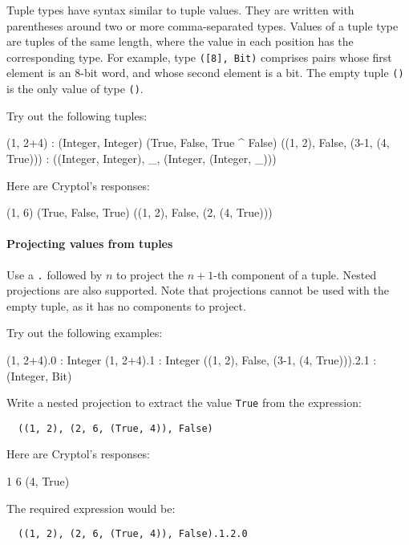 Tuple types have syntax similar to tuple values. They are written with
parentheses around two or more comma-separated types. Values of a
tuple type are tuples of the same length, where the value in each
position has the corresponding type. For example, type \texttt{([8],
  Bit)} comprises pairs whose first element is an 8-bit word, and whose
second element is a bit. The empty tuple \texttt{()} is the only value
of type \texttt{()}.

\begin{Exercise}\label{ex:tup:1}
Try out the following tuples:
\restartrepl
\begin{replinVerb}
  (1, 2+4) : (Integer, Integer)
  (True, False, True ^ False)
  ((1, 2), False, (3-1, (4, True))) : ((Integer, Integer), _, (Integer, (Integer, _)))
\end{replinVerb}
\end{Exercise}
\begin{Answer}
Here are Cryptol's responses:
\begin{reploutVerb}
  (1, 6)
  (True, False, True)
  ((1, 2), False, (2, (4, True)))
\end{reploutVerb}
\end{Answer}


\paragraph*{Projecting values from tuples} Use a \texttt{.} followed by
$n$ to project the $n+1$-th component of a tuple. Nested projections
are also supported. Note that projections cannot be used with the
empty tuple, as it has no components to project.

\begin{Exercise}\label{ex:tup:2}
Try out the following examples:
\restartrepl
\begin{replinVerb}
  (1, 2+4).0 : Integer
  (1, 2+4).1 : Integer
  ((1, 2), False, (3-1, (4, True))).2.1 : (Integer, Bit)
\end{replinVerb}
Write a nested projection to extract the value \texttt{True} from the
expression:
\begin{Verbatim}
  ((1, 2), (2, 6, (True, 4)), False)
\end{Verbatim}
\end{Exercise}
\begin{Answer}
Here are Cryptol's responses:
\begin{reploutVerb}
  1
  6
  (4, True)
\end{reploutVerb}
The required expression would be:
\begin{Verbatim}
  ((1, 2), (2, 6, (True, 4)), False).1.2.0
\end{Verbatim}
\end{Answer}

